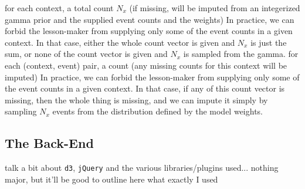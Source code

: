 \documentclass[11pt,letterpaper]{article}
\begin{document}
\begin{description}
\begin{itemize}
for each context, a total count $N_x$ (if missing, will be imputed from an integerized gamma prior and the supplied event counts and the weights)
In practice, we can forbid the lesson-maker from supplying only some of the event counts in a given context.  In that case, either the whole count vector is given and $N_x$ is just the sum, or none of the count vector is given and $N_x$ is sampled from the gamma.
for each (context, event) pair, a count (any missing counts for this context will be imputed)
In practice, we can forbid the lesson-maker from supplying only some of the event counts in a given context.  In that case, if any of this count vector is missing, then the whole thing is missing, and we can impute it simply by sampling $N_x$ events from the distribution defined by the model weights.
\end{itemize}
\end{description}

\subsection{The Back-End}
talk a bit about {\tt d3}, {\tt jQuery} and the various libraries/plugins used... nothing major, but it'll be good to outline here what exactly I used
\end{document}
